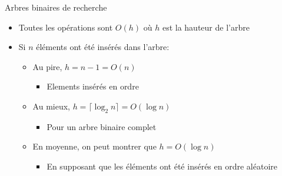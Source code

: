 \begin{frame}{Arbres binaires de recherche}

\begin{itemize}
\item Toutes les opérations sont $O(h)$ où $h$ est la hauteur de l'arbre
\item Si $n$ éléments ont été insérés dans l'arbre:
\begin{itemize}
\item Au pire, $h=n-1=O(n)$
\begin{itemize}
\item Elements insérés en ordre
\end{itemize}
\item Au mieux, $h=\lceil\log_2 n\rceil=O(\log n)$
\begin{itemize}
\item Pour un arbre binaire complet
\end{itemize}
\item En moyenne, on peut montrer que $h=O(\log n)$
\begin{itemize}
\item En supposant que les éléments ont été insérés en ordre aléatoire
\end{itemize}
\end{itemize}
\end{itemize}

\end{frame}

